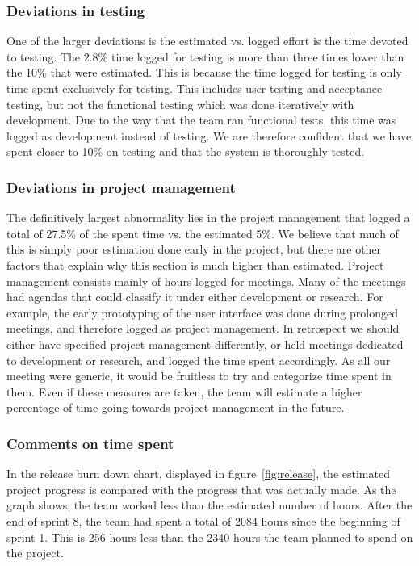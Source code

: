 \subsubsection{Deviations in testing}
One of the larger deviations is the estimated vs. logged effort is the time devoted to testing. The 2.8\% time logged for testing is more than three times lower than the 10\% that were estimated. This is because the time logged for testing is only time spent exclusively for testing. This includes user testing and acceptance testing, but not the functional testing which was done iteratively with development. Due to the way that the team ran functional tests, this time was logged as development instead of testing. We are therefore confident that we have spent closer to 10\% on testing and that the system is thoroughly tested.

\subsubsection{Deviations in project management}
The definitively largest abnormality lies in the project management that logged a total of 27.5\% of the spent time vs. the estimated 5\%. We believe that much of this is simply poor estimation done early in the project, but there are other factors that explain why this section is much higher than estimated. Project management consists mainly of hours logged for meetings. Many of the meetings had agendas that could classify it under either development or research. For example, the early prototyping of the user interface was done during prolonged meetings, and therefore logged as project management. In retrospect we should either have specified project management differently, or held meetings dedicated to development or research, and logged the time spent accordingly. As all our meeting were generic, it would be fruitless to try and categorize time spent in them. Even if these measures are taken, the team will estimate a higher percentage of time going towards project management in the future. 

\subsubsection{Comments on time spent}
In the release burn down chart, displayed in figure~\ref{fig:release}, the estimated project progress is compared with the progress that was actually made. As the graph shows, the team worked less than the estimated number of hours. After the end of sprint 8, the team had spent a total of 2084 hours since the beginning of sprint 1. This is 256 hours less than the 2340 hours the team planned to spend on the project.

